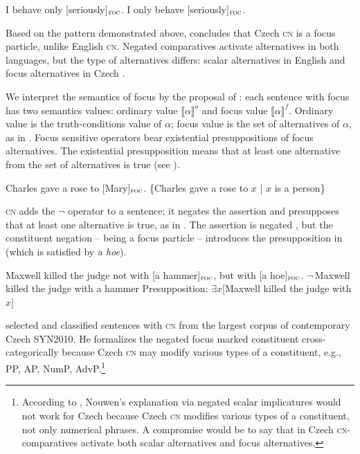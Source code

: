 \documentclass[output=paper,
]{langscibook}
\begin{document}
\ea \label{ex:only_e}
	\ea I behave only [seriously]$_{\textsc{foc}}$.
    \ex I only behave [seriously]$_{\textsc{foc}}$.\hfill\citep{dovcekal2017upper}
\z
\z


\noindent Based on the pattern demonstrated above, \cite{dovcekal2017upper} concludes that Czech \textsc{cn} is a focus particle, unlike English \textsc{cn}. Negated comparatives activate alternatives in both languages, but the type of alternatives differs: scalar alternatives in English \citep{nouwen2008upper} and focus alternatives in Czech \citep{dovcekal2017upper}. 

We interpret the semantics of focus by the proposal of \cite{rooth1985association,rooth1992theory}: each sentence with focus has two semantics values: ordinary value $\llbracket \alpha
 \rrbracket^{o}$ and focus value $\llbracket \alpha \rrbracket^{f}$. Ordinary value is the truth-conditions value of $\alpha$; focus value is the set of alternatives of $\alpha$, as in . Focus sensitive operators bear existential presuppositions of focus alternatives. The existential presupposition means that at least one alternative from the set of alternatives is true (see \citealt{rooth1985association,rooth1992theory}).
 
\ea \ea Charles gave a rose to [Mary]$_{\textsc{foc}}$. 
	\ex \{Charles gave a rose to $x$ | $x$ is a person\}
    \label{ex:set}
\z
\z


\noindent \textsc{cn} adds the $\neg$ operator to a sentence; it negates the assertion and presupposes that at least one alternative is true, as in . The assertion is negated , but the constituent negation -- being a focus particle -- introduces the presupposition in  (which is satisfied by \textit{a hoe}).

\ea  Maxwell killed the judge not with [a hammer]$_{\textsc{foc}}$, but with [a hoe]$_{\textsc{foc}}$. \label{ex:hammer} \ea $\neg\,$Maxwell killed the judge with a hammer \label{ex:negham}
\ex Presupposition: $\exists x[$Maxwell killed the judge with $x]$ \label{ex:presham}
\z
\z

\noindent \cite{dovcekal2017upper} selected and classified sentences with \textsc{cn} from the largest corpus of contemporary Czech SYN2010. He formalizes the negated focus marked constituent cross-categorically because Czech \textsc{cn} may modify various types of a constituent, e.g., PP, AP, NumP, AdvP.\footnote{\label{footn:expl}According to \cite{dovcekal2017upper}, Nouwen's explanation via negated scalar implicatures would not work for Czech because Czech \textsc{cn} modifies various types of a constituent, not only numerical phrases. A compromise would be to say that in Czech \textsc{cn-}comparatives activate both scalar alternatives and focus alternatives.} 
\end{document}

